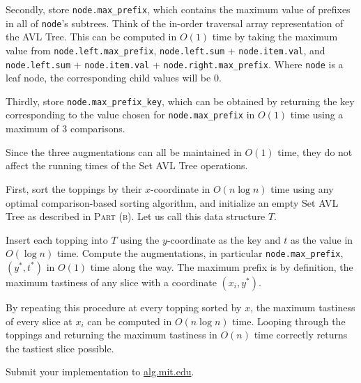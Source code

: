 \documentclass[12pt,twoside]{article}
\begin{document}
\begin{problems}
\begin{problemparts}
Secondly, store \verb|node.max_prefix|, which contains the maximum value of prefixes in all of \verb|node|'s subtrees. Think of the in-order traversal array representation of the AVL Tree. This can be computed in $O(1)$ time by taking the maximum value from \verb|node.left.max_prefix|, \verb|node.left.sum| + \verb|node.item.val|, and \verb|node.left.sum| + \verb|node.item.val| + \verb|node.right.max_prefix|. Where \verb|node| is a leaf node, the corresponding child values will be 0.

Thirdly, store \verb|node.max_prefix_key|, which can be obtained by returning the key corresponding to the value chosen for \verb|node.max_prefix| in $O(1)$ time using a maximum of 3 comparisons.

Since the three augmentations can all be maintained in $O(1)$ time, they do not affect the running times of the Set AVL Tree operations.

\problempart %
First, sort the toppings by their $x$-coordinate in $O(n \log n)$ time using any optimal comparison-based sorting algorithm, and initialize an empty Set AVL Tree as described in \textsc{Part (b)}. Let us call this data structure $T$.

Insert each topping into $T$ using the $y$-coordinate as the key and $t$ as the value in $O(\log n)$ time. Compute the augmentations, in particular \verb|node.max_prefix|, $(y^*,t^*)$ in $O(1)$ time along the way. The maximum prefix is by definition, the maximum tastiness of any slice with a coordinate $(x_i, y^*)$.

By repeating this procedure at every topping sorted by $x$, the maximum tastiness of every slice at $x_i$ can be computed in $O(n \log n)$ time. Looping through the toppings and returning the maximum tastiness in $O(n)$ time correctly returns the tastiest slice possible.

\problempart Submit your implementation to {\small\url{alg.mit.edu}}.
\end{problemparts}

\end{problems}
\end{document}
